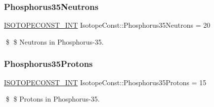 \subsubsection{\texorpdfstring{Phosphorus35\+Neutrons}{Phosphorus35Neutrons}}
{\footnotesize\ttfamily \mbox{\hyperlink{group___isotope_const-_macros_ga5f18360b3e99483a35c32d789e62621c}{I\+S\+O\+T\+O\+P\+E\+C\+O\+N\+S\+T\+\_\+\+I\+NT}} Isotope\+Const\+::\+Phosphorus35\+Neutrons = 20}

\$ \$ Neutrons in Phosphorus-\/35. \mbox{\label{group___isotope_const-_phosphorus-_p35_gaad537bcc521de931dbdc0ec5d6808e2d}} 
\subsubsection{\texorpdfstring{Phosphorus35\+Protons}{Phosphorus35Protons}}
{\footnotesize\ttfamily \mbox{\hyperlink{group___isotope_const-_macros_ga5f18360b3e99483a35c32d789e62621c}{I\+S\+O\+T\+O\+P\+E\+C\+O\+N\+S\+T\+\_\+\+I\+NT}} Isotope\+Const\+::\+Phosphorus35\+Protons = 15}

\$ \$ Protons in Phosphorus-\/35. 